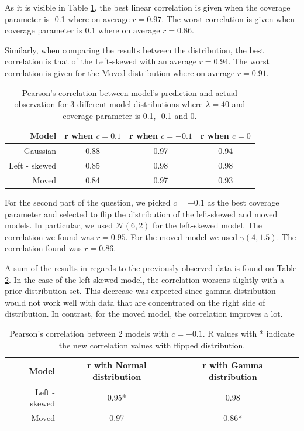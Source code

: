 \documentclass[11pt,a4paper,oneside]{article}
\begin{document}
As it is visible in Table \ref{question_3}, the best linear correlation is given when the coverage parameter is -0.1 where on average $r = 0.97$. The worst correlation is given when coverage parameter is 0.1 where on average $r = 0.86$.

Similarly, when comparing the results between the distribution, the best correlation is that of the Left-skewed with an average $r = 0.94$. The worst correlation is given for the Moved distribution where on average $r = 0.91$.

\begin{table}[ht]
\centering
\begin{tabular}{rccc}
  \hline
 Model & r when $c = 0.1$ & r when $c = -0.1$ & r when $c = 0$ \\ 
  \hline
    Gaussian & 0.88 & 0.97 & 0.94\\ 
    Left - skewed & 0.85 & 0.98 & 0.98\\ 
    Moved & 0.84 & 0.97 & 0.93\\ 
   \hline
\end{tabular}
\caption{Pearson's correlation between model's prediction and actual observation for 3 different model distributions where $\lambda = 40$ and coverage parameter is 0.1, -0.1 and 0.}
\label{question_3}
\end{table}

For the second part of the question, we picked $c = -0.1$ as the best coverage parameter and selected to flip the distribution of the left-skewed and moved models. In particular, we used $\mathcal{N}(6, 2)$ for the left-skewed model. The correlation we found was $r = 0.95$. For the moved model we used $\mathcal{\gamma}(4, 1.5)$. The correlation found was $r = 0.86$.

A sum of the results in regards to the previously observed data is found on Table \ref{question_3_flipped}. In the case of the left-skewed model, the correlation worsens slightly with a prior distribution set. This decrease was expected since gamma distribution would not work well with data that are concentrated on the right side of distribution. In contrast, for the moved model, the correlation improves a lot. 

\begin{table}[ht]
\centering
\begin{tabular}{rccr}
  \hline
 Model & r with Normal distribution & r with Gamma distribution\\ 
  \hline
    Left - skewed & 0.95* & 0.98 \\ 
    Moved & 0.97 & 0.86* \\ 
   \hline
\end{tabular}
\caption{Pearson's correlation between 2 models with $c = -0.1$. R values with * indicate the new correlation values with flipped distribution.}
\label{question_3_flipped}
\end{table}
\end{document}
